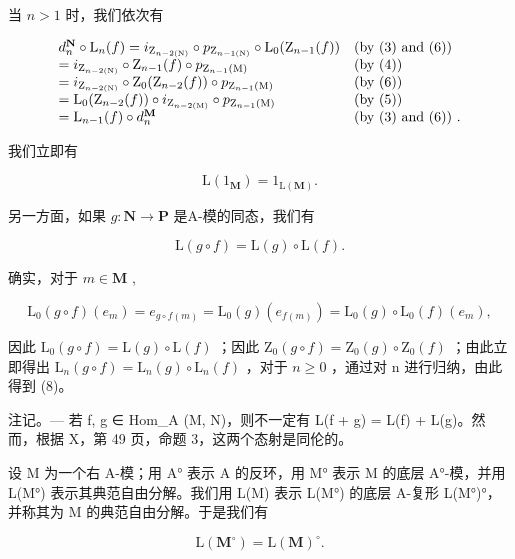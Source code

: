 当 \(n > 1\) 时，我们依次有

\[
\begin{array}{l l} d _ {n} ^ {\mathbf {N}} \circ \mathrm{L} _ {n} (f) = i _ {\mathrm{Z} _ {n - 2 (\mathrm{N})}} \circ p _ {\mathrm{Z} _ {n - 1 (\mathrm{N})}} \circ \mathrm{L} _ {0} (\mathrm{Z} _ {n - 1} (f)) & \text {(by (3) and (6))} \\ = i _ {\mathrm{Z} _ {n - 2 (\mathrm{N})}} \circ \mathrm{Z} _ {n - 1} (f) \circ p _ {\mathrm{Z} _ {n - 1} (\mathrm{M})} & \text {(by (4))} \\ = i _ {\mathrm{Z} _ {n - 2 (\mathrm{N})}} \circ \mathrm{Z} _ {0} (\mathrm{Z} _ {n - 2} (f)) \circ p _ {\mathrm{Z} _ {n - 1} (\mathrm{M})} & \text {(by (6))} \\ = \mathrm{L} _ {0} (\mathrm{Z} _ {n - 2} (f)) \circ i _ {\mathrm{Z} _ {n - 2 (\mathrm{M})}} \circ p _ {\mathrm{Z} _ {n - 1} (\mathrm{M})} & \text {(by (5))} \\ = \mathrm{L} _ {n - 1} (f) \circ d _ {n} ^ {\mathbf {M}} & \text {(by (3) and (6)) .} \end{array}
\]

我们立即有

\[
\mathrm{L} (1 _ {\mathbf {M}}) = 1 _ {\mathrm{L} (\mathbf {M})}.\tag{7}
\]

另一方面，如果 \(g: \mathbf{N} \to \mathbf{P}\) 是A-模的同态，我们有

\[
\mathrm{L} (g \circ f) = \mathrm{L} (g) \circ \mathrm{L} (f).\tag{8}
\]

确实，对于 \(m \in \mathbf{M}\) ,

\[
\mathrm{L} _ {0} (g \circ f) \left(e _ {m}\right) = e _ {g \circ f (m)} = \mathrm{L} _ {0} (g) \left(e _ {f (m)}\right) = \mathrm{L} _ {0} (g) \circ \mathrm{L} _ {0} (f) \left(e _ {m}\right),
\]

因此 \(\mathrm{L}_{0}(g\circ f)=\mathrm{L}(g)\circ\mathrm{L}(f)\) ；因此 \(\mathrm{Z}_{0}(g\circ f)=\mathrm{Z}_{0}(g)\circ\mathrm{Z}_{0}(f)\) ；由此立即得出 \(\mathrm{L}_{n}(g\circ f)=\mathrm{L}_{n}(g)\circ\mathrm{L}_{n}(f)\) ，对于 \(n\geqslant0\) ，通过对 n 进行归纳，由此得到 (8)。

注记。--- 若 f, g ∈ Hom\_A (M, N)，则不一定有 L(f + g) = L(f) + L(g)。然而，根据 X，第 49 页，命题 3，这两个态射是同伦的。

设 M 为一个右 A-模；用 A° 表示 A 的反环，用 M° 表示 M 的底层 A°-模，并用 L(M°) 表示其典范自由分解。我们用 L(M) 表示 L(M°) 的底层 A-复形 L(M°)°，并称其为 M 的典范自由分解。于是我们有

\[
\mathrm{L} (\mathbf {M} ^ {\circ}) = \mathrm{L} (\mathbf {M}) ^ {\circ}.
\]
\relax{}
